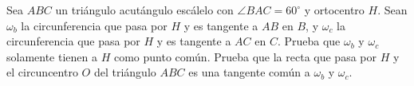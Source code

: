 Sea $ABC$ un triángulo acutángulo escálelo con $\angle BAC=60^{\circ}$ y ortocentro $H$. Sean $\omega_b$ la circunferencia que pasa por $H$ y es tangente a $AB$ en $B$, y $\omega_c$ la circunferencia que pasa por $H$ y es tangente a $AC$ en $C$. Prueba que $\omega_b$ y $\omega_c$ solamente tienen a $H$ como punto común. Prueba que la recta que pasa por $H$ y el circuncentro $O$ del triángulo $ABC$ es una tangente común a $\omega_b$ y $\omega_c$.